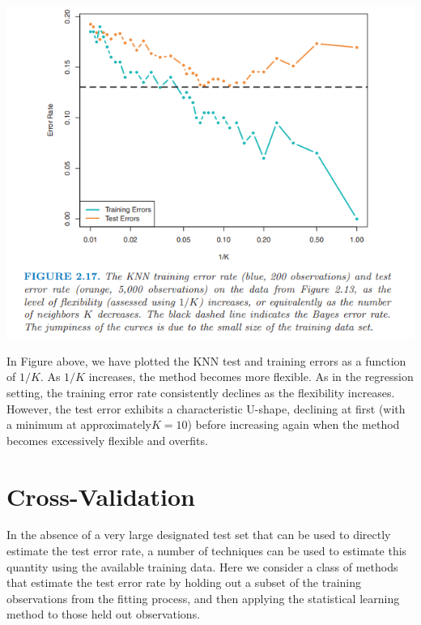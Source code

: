 \begin{center}
    \includegraphics[scale=0.7]{images/knn-training-val error.png}
\end{center}
In Figure above, we have plotted the KNN test and training errors as a function of $1/K$. As $1/K$ increases, the method becomes more flexible. As in the regression setting, the training error rate consistently declines as the flexibility increases. However, the test error exhibits a characteristic U-shape, declining at first (with a
minimum at approximately$ K = 10$) before increasing again when the
method becomes excessively flexible and overfits.

\section{Cross-Validation}
In the absence of a very large designated test set that can be used to
directly estimate the test error rate, a number of techniques can be used to estimate this quantity using the available training data. Here we consider a class of methods that estimate the test error rate by holding out a subset of the training observations from the fitting process, and then applying the statistical learning method to those held out observations.

